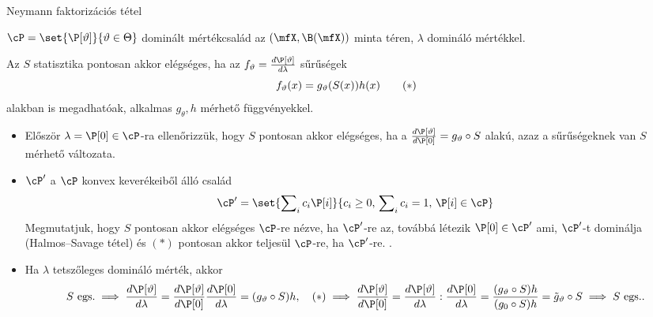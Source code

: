\documentclass[aspectratio=169,notheorems,9pt,\option]{beamer}
\begin{document}
\begin{frame}{Neymann faktorizációs tétel}
  \begin{theorem}
    $\cP=\set{\P[\theta]}{\theta\in\Theta}$ dominált mértékcsalád az 
    $(\mfX,\B(\mfX))$ minta téren, $\lambda$ domináló mértékkel. 
    
    Az $S$  statisztika pontosan akkor elégséges, ha az 
    $f_\theta=\frac{d\P[\theta]}{d\lambda}$ 
    sűrűségek
    \begin{displaymath}
      f_{\theta}(x)=g_{\theta}(S(x))h(x)  \tag{\hbox{${*}$}}
    \end{displaymath}
    alakban is megadhatóak, 
    alkalmas $g_\theta,h$ mérhető függvényekkel.
  \end{theorem}
  \begin{itemize}
    \item Először $\lambda=\P[0]\in\cP$-ra ellenőrizzük, hogy $S$ pontosan 
    akkor elégséges, ha a $\frac{d\P[\theta]}{d\P[0]}=g_\theta\circ S$ alakú, azaz
    a sűrűségeknek van $S$ mérhető változata.
    \item $\cP'$ a $\cP$ konvex keverékeiből álló család  
    \begin{displaymath}
      \cP'=\set{\sum\nolimits_i c_i\P[i]}{c_i\geq0,\,\sum\nolimits_i c_i=1,\,\P[i]\in\cP}  
    \end{displaymath}
    Megmutatjuk, hogy $S$ pontosan akkor elégséges $\cP$-re nézve, ha $\cP'$-re az, 
    továbbá létezik $\P[0]\in \cP'$ ami, $\cP'$-t dominálja (Halmos--Savage tétel) 
    és $(*)$ pontosan akkor teljesül $\cP$-re, ha $\cP'$-re. .
    \item Ha $\lambda$ tetszőleges domináló mérték, akkor 
    \begin{displaymath}
      \text{$S$ egs.}\implies\frac{d\P[\theta]}{d\lambda}
      =\frac{d\P[\theta]}{d\P[0]}\frac{d\P[0]}{d\lambda}
      =(g_\theta\circ S) h,
      \quad\text{$(*)$}\implies
      \frac{d\P[\theta]}{d\P[0]}=\frac{d\P[\theta]}{d\lambda}:\frac{d\P[0]}{d\lambda}
      =\frac{(g_\theta\circ S) h}{(g_0\circ S) h}
      =\tilde g_\theta\circ S\implies \text{$S$ egs.}.
    \end{displaymath}
  \end{itemize}

\end{frame}
\end{document}
